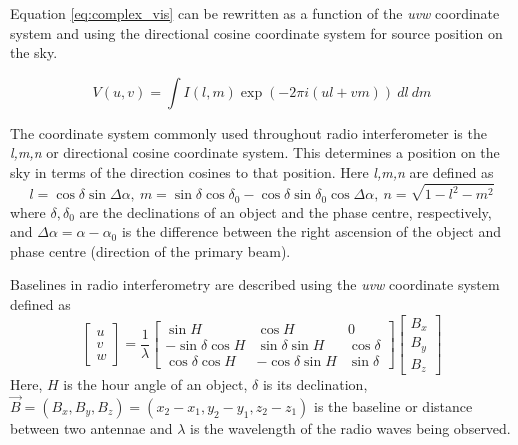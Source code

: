 Equation \ref{eq:complex_vis} can be rewritten as a function of the \textit{uvw} coordinate system and using the directional cosine coordinate system for source position on the sky.

\begin{equation}
\label{eq:complex_vis_uvw}
V(u,v) = \int I(l,m) \exp{(-2 \pi i (ul + vm))}\ dl\ dm
\end{equation}

The coordinate system commonly used throughout radio interferometer is the \textit{l,m,n} or directional cosine coordinate system. This determines a position on the sky in terms of the direction cosines to that position. Here \textit{l,m,n} are defined as
$$ l =  \cos \delta  \sin \Delta \alpha, \ 
 m = \sin \delta \cos \delta_0 - \cos \delta \sin \delta_0 \cos\Delta \alpha, \ 
 n = \sqrt{1-l^2-m^2}$$
where $\delta, \delta_0$ are the declinations of an object and the phase centre, respectively, and $\Delta \alpha = \alpha -\alpha_0$ is the difference between the right ascension of the object and phase centre (direction of the primary beam).

Baselines in radio interferometry are described using the \textit{uvw} coordinate system defined as
\[
\begin{bmatrix}
    u \\
    v \\
    w
\end{bmatrix}
=
\dfrac{1}{\lambda}
\begin{bmatrix}
    \sin H       & \cos H & 0 \\
    -\sin \delta \cos H       & \sin \delta \sin H & \cos \delta \\
    \cos \delta \cos H       & -\cos \delta \sin H & \sin \delta
    

\end{bmatrix}
%
\begin{bmatrix}
    B_x \\
    B_y \\
    B_z
    

\end{bmatrix}
\]
Here, $H$ is the hour angle of an object, $\delta$ is its declination, $\Vec{B}=(B_x, B_y, B_z)=(x_2-x_1,y_2-y_1,z_2-z_1)$ is the baseline or distance between two antennae and $\lambda$ is the wavelength of the radio waves being observed.
